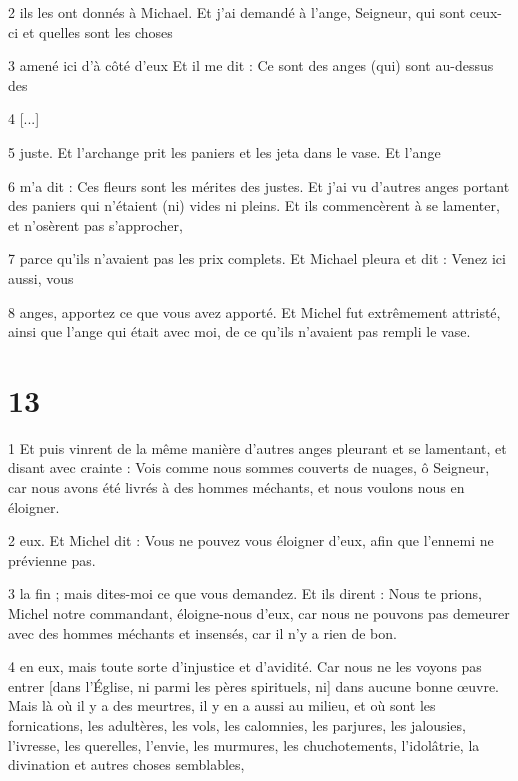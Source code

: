 \par 2 ils les ont donnés à Michael. Et j'ai demandé à l'ange, Seigneur, qui sont ceux-ci et quelles sont les choses

\par 3 amené ici d'à côté d'eux Et il me dit : Ce sont des anges (qui) sont au-dessus des

\par 4 [...]

\par 5 juste. Et l'archange prit les paniers et les jeta dans le vase. Et l'ange

\par 6 m'a dit : Ces fleurs sont les mérites des justes. Et j'ai vu d'autres anges portant des paniers qui n'étaient (ni) vides ni pleins. Et ils commencèrent à se lamenter, et n'osèrent pas s'approcher,

\par 7 parce qu'ils n'avaient pas les prix complets. Et Michael pleura et dit : Venez ici aussi, vous

\par 8 anges, apportez ce que vous avez apporté. Et Michel fut extrêmement attristé, ainsi que l'ange qui était avec moi, de ce qu'ils n'avaient pas rempli le vase.

\chapter{13}

\par 1 Et puis vinrent de la même manière d'autres anges pleurant et se lamentant, et disant avec crainte : Vois comme nous sommes couverts de nuages, ô Seigneur, car nous avons été livrés à des hommes méchants, et nous voulons nous en éloigner.

\par 2 eux. Et Michel dit : Vous ne pouvez vous éloigner d'eux, afin que l'ennemi ne prévienne pas.

\par 3 la fin ; mais dites-moi ce que vous demandez. Et ils dirent : Nous te prions, Michel notre commandant, éloigne-nous d'eux, car nous ne pouvons pas demeurer avec des hommes méchants et insensés, car il n'y a rien de bon.

\par 4 en eux, mais toute sorte d'injustice et d'avidité. Car nous ne les voyons pas entrer [dans l’Église, ni parmi les pères spirituels, ni] dans aucune bonne œuvre. Mais là où il y a des meurtres, il y en a aussi au milieu, et où sont les fornications, les adultères, les vols, les calomnies, les parjures, les jalousies, l'ivresse, les querelles, l'envie, les murmures, les chuchotements, l'idolâtrie, la divination et autres choses semblables,

